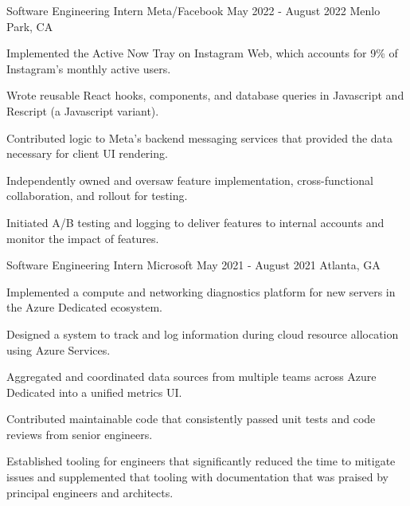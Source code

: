 

\begin{cventries}

\cventry
{Software Engineering Intern}
{Meta/Facebook}
{May 2022 - August 2022}
{Menlo Park, CA}
{
\begin{cvitems}
    \item Implemented the Active Now Tray on Instagram Web, which accounts for 9\% of Instagram's monthly active users. 
    \item Wrote reusable React hooks, components, and database queries in Javascript and Rescript (a Javascript variant).
    \item Contributed logic to Meta's backend messaging services that provided the data necessary for client UI rendering.
    \item Independently owned and oversaw feature implementation, cross-functional collaboration, and rollout for testing.
    \item Initiated A/B testing and logging to deliver features to internal accounts and monitor the impact of features.
\end{cvitems}
}

\cventry
{Software Engineering Intern}
{Microsoft}
{May 2021 - August 2021}
{Atlanta, GA}
{
\begin{cvitems}
    \item Implemented a compute and networking diagnostics platform for new servers in the Azure Dedicated ecosystem.
    \item Designed a system to track and log information during cloud resource allocation using Azure Services.
    \item Aggregated and coordinated data sources from multiple teams across Azure Dedicated into a unified metrics UI.
    \item Contributed maintainable code that consistently passed unit tests and code reviews from senior engineers.
    \item Established tooling for engineers that significantly reduced the time to mitigate issues
    and supplemented that tooling with documentation that was praised by principal engineers and architects.
\end{cvitems}
}


\end{cventries}
